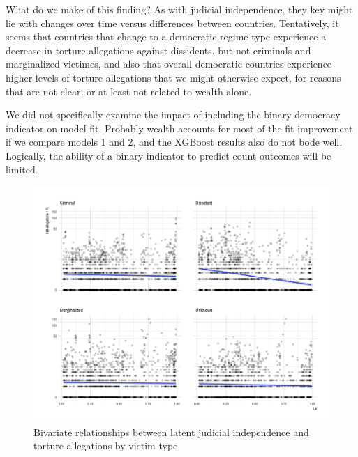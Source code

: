 \documentclass[12pt]{article}
\begin{document}
What do we make of this finding? As with judicial independence, they key might lie with changes over time versus differences between countries. Tentatively, it seems that countries that change to a democratic regime type experience a decrease in torture allegations against dissidents, but not criminals and marginalized victimes, and also that overall democratic countries experience higher levels of torture allegations that we might otherwise expect, for reasons that are not clear, or at least not related to wealth alone. 

We did not specifically examine the impact of including the binary democracy indicator on model fit. Probably wealth accounts for most of the fit improvement if we compare models 1 and 2, and the XGBoost results also do not bode well. Logically, the ability of a binary indicator to predict count outcomes will be limited. 

\begin{figure}
\begin{center}
\caption{Bivariate relationships between latent judicial independence and torture allegations by victim type}
\label{fig:lji-bivariate}
\includegraphics[width=.7\textwidth]{../output/scatterplot-itt-allegations-v-lji.png}
\end{center}
\end{figure}
\end{document}
